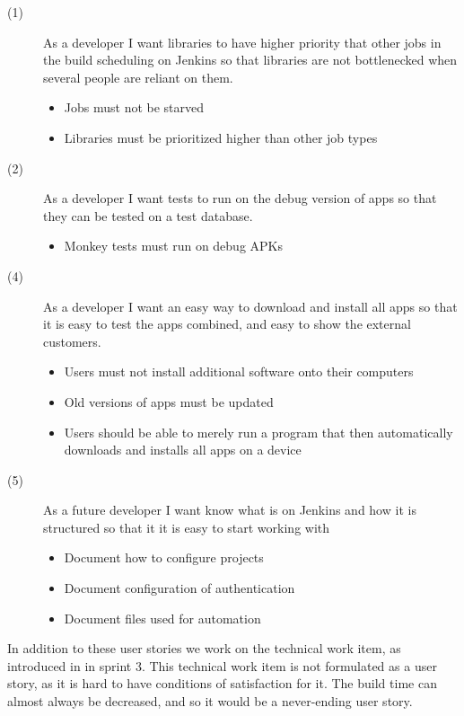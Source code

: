 \begin{description}
  \item[(1)] As a developer I want libraries to have higher priority that other jobs in the build scheduling on Jenkins so that libraries are not bottlenecked when several people are reliant on them.
  \begin{itemize}
    \item Jobs must not be starved
    \item Libraries must be prioritized higher than other job types
  \end{itemize}
  \item[(2)] As a developer I want tests to run on the debug version of apps so that they can be tested on a test database.
  \begin{itemize}
    \item Monkey tests must run on debug APKs
  \end{itemize}
  \item[(4)] As a developer I want an easy way to download and install all apps so that it is easy to test the apps combined, and easy to show the external customers.
  \begin{itemize}
    \item Users must not install additional software onto their computers
    \item Old versions of apps must be updated
    \item Users should be able to merely run a program that then automatically downloads and installs all apps on a device
  \end{itemize}
  \item[(5)] As a future developer I want know what is on Jenkins and how it is structured so that it it is easy to start working with
  \begin{itemize}
    \item Document how to configure projects
    \item Document configuration of authentication
    \item Document files used for automation
  \end{itemize}
\end{description}

In addition to these user stories we work on the technical work item, as introduced in  in sprint 3. This technical work item is not formulated as a user story, as it is hard to have conditions of satisfaction for it. The build time can almost always be decreased, and so it would be a never-ending user story.


